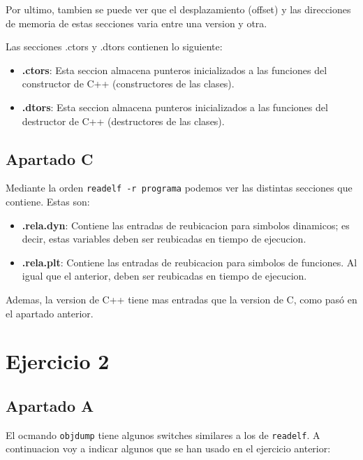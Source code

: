 \documentclass{article}
\begin{document}
Por ultimo, tambien se puede ver que el desplazamiento (offset) y las direcciones de memoria de estas secciones varia entre una version y otra.


\bigskip

Las secciones .ctors y .dtors contienen lo siguiente:

\begin{itemize}
    \item \textbf{.ctors}: Esta seccion almacena punteros inicializados a las funciones del constructor de C++ (constructores de las clases).
    \item \textbf{.dtors}: Esta seccion almacena punteros inicializados a las funciones del destructor de C++ (destructores de las clases).
\end{itemize}


\subsection*{Apartado C}

Mediante la orden \verb|readelf -r programa| podemos ver las distintas secciones que contiene. Estas son:

\begin{itemize}
    \item \textbf{.rela.dyn}: Contiene las entradas de reubicacion para simbolos dinamicos; es decir, estas variables deben ser reubicadas en tiempo de ejecucion.
    \item \textbf{.rela.plt}: Contiene las entradas de reubicacion para simbolos de funciones. Al igual que el anterior, deben ser reubicadas en tiempo de ejecucion.
\end{itemize}

Ademas, la version de C++ tiene mas entradas que la version de C, como pasó en el apartado anterior.


\section*{Ejercicio 2}


\subsection*{Apartado A}

El ocmando \verb|objdump| tiene algunos switches similares a los de \verb|readelf|. A continuacion voy a indicar algunos que se han usado en el ejercicio anterior:
\end{document}
